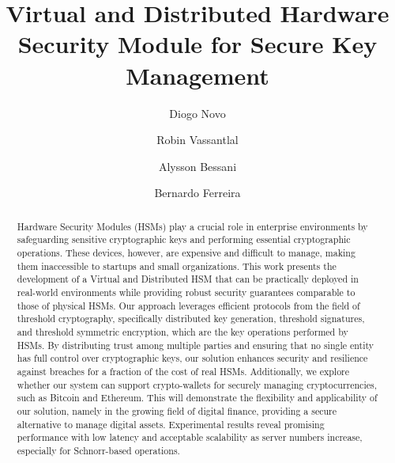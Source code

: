 \documentclass[runningheads]{llncs}
\begin{document}
%
\title{Virtual and Distributed Hardware Security Module for Secure Key Management}
%
%
\author{Diogo Novo \and
Robin Vassantlal \and
Alysson Bessani \and
Bernardo Ferreira 
}
%
%
%
\maketitle              %
%
\begin{abstract}
Hardware Security Modules (HSMs) play a crucial role in enterprise environments by safeguarding sensitive cryptographic keys and performing essential cryptographic operations. These devices, however, are expensive and difficult to manage, making them inaccessible to startups and small organizations. This work presents the development of a Virtual and Distributed HSM that can be practically deployed in real-world environments while providing robust security guarantees comparable to those of physical HSMs.
Our approach leverages efficient protocols from the field of threshold cryptography, specifically distributed key generation, threshold signatures, and threshold symmetric encryption, which are the key operations performed by HSMs. By distributing trust among multiple parties and ensuring that no single entity has full control over cryptographic keys, our solution enhances security and resilience against breaches for a fraction of the cost of real HSMs. Additionally, we explore whether our system can support crypto-wallets for securely managing cryptocurrencies, such as Bitcoin and Ethereum. This will demonstrate the flexibility and applicability of our solution, namely in the growing field of digital finance, providing a secure alternative to manage digital assets.
Experimental results reveal promising performance with low latency and acceptable scalability as server numbers increase, especially for Schnorr-based operations.

\end{abstract} 
%
%
%
\end{document}
